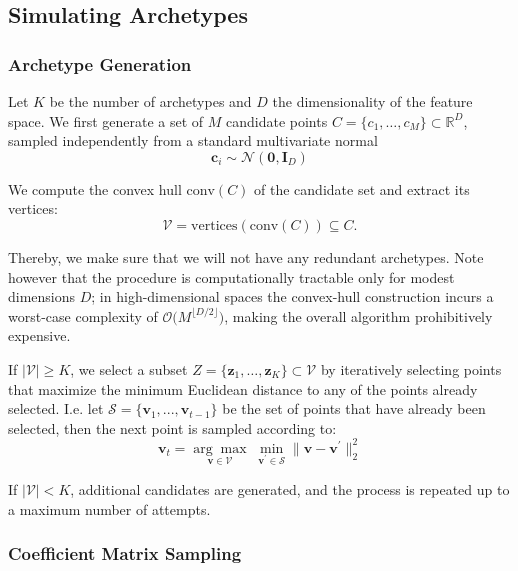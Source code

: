 \documentclass{article}
\begin{document}
\subsection{Simulating Archetypes}

\subsubsection{Archetype Generation}

Let $K$ be the number of archetypes and $D$ the dimensionality of the feature space. We first generate a set of $M$ candidate points $C = \{c_1, \dots, c_M\} \subset \mathbb{R}^D$, sampled independently from a standard multivariate normal
\begin{equation}
    \mathbf{c}_i \sim \mathcal{N}(\mathbf{0}, \mathbf{I}_D)
\end{equation}

We compute the convex hull $\mathrm{conv}(C)$ of the candidate set and extract its vertices:
\begin{equation}
    \mathcal{V} = \mathrm{vertices}(\mathrm{conv}(C)) \subseteq C.
\end{equation}

Thereby, we make sure that we will not have any redundant archetypes. Note however that the procedure is computationally tractable only for modest dimensions $D$; in high-dimensional spaces the convex-hull construction incurs a worst-case complexity of $\mathcal{O}\!\bigl(M^{\lfloor D/2\rfloor}\bigr)$, making the overall algorithm prohibitively expensive.

If $|\mathcal{V}| \geq K$, we select a subset $Z = \{\mathbf{z}_1, \dots, \mathbf{z}_K\} \subset \mathcal{V}$ by iteratively selecting points that maximize the minimum Euclidean distance to any of the points already selected. I.e. let $\mathcal{S} = \{\mathbf{v}_1, ..., \mathbf{v}_{t-1}\}$ be the set of points that have already been selected, then the next point is sampled according to:
\begin{equation}
    \mathbf{v}_t = \underset{\mathbf{v} \in \mathcal{V}}{\arg \max} \; \underset{\mathbf{v}^\prime \in \mathcal{S}}{\min} \| \mathbf{v} - \mathbf{v}^\prime \|_2^2
\end{equation}

If $|\mathcal{V}| < K$, additional candidates are generated, and the process is repeated up to a maximum number of attempts.

\subsubsection{Coefficient Matrix Sampling}
\end{document}
